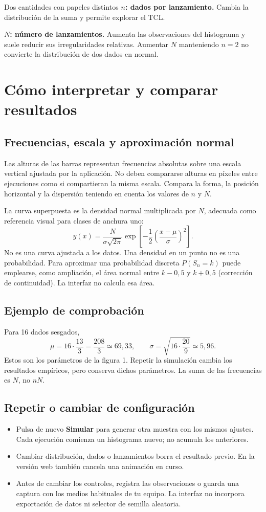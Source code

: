 \documentclass[11pt,a4paper]{article}
\begin{document}
\begin{nota}{Dos cantidades con papeles distintos}
\textbf{$n$: dados por lanzamiento.} Cambia la distribución de la suma y permite explorar el TCL.

\textbf{$N$: número de lanzamientos.} Aumenta las observaciones del histograma y suele reducir sus irregularidades relativas. Aumentar $N$ manteniendo $n=2$ no convierte la distribución de dos dados en normal.
\end{nota}

\clearpage\section{Cómo interpretar y comparar resultados}
\subsection{Frecuencias, escala y aproximación normal}
Las alturas de las barras representan frecuencias absolutas sobre una escala vertical ajustada por la aplicación. No deben compararse alturas en píxeles entre ejecuciones como si compartieran la misma escala. Compara la forma, la posición horizontal y la dispersión teniendo en cuenta los valores de $n$ y $N$.

La curva superpuesta es la densidad normal multiplicada por $N$, adecuada como referencia visual para clases de anchura uno:
\[
y(x)=\frac{N}{\sigma\sqrt{2\pi}}\exp\!\left[-\frac12\left(\frac{x-\mu}{\sigma}\right)^2\right].
\]
No es una curva ajustada a los datos. Una densidad en un punto no es una probabilidad. Para aproximar una probabilidad discreta $P(S_n=k)$ puede emplearse, como ampliación, el área normal entre $k-0{,}5$ y $k+0{,}5$ (corrección de continuidad). La interfaz no calcula esa área.

\subsection{Ejemplo de comprobación}
Para 16 dados sesgados,
\[
\mu=16\cdot\frac{13}{3}=\frac{208}{3}\simeq69{,}33,
\qquad \sigma=\sqrt{16\cdot\frac{20}{9}}\simeq5{,}96.
\]
Estos son los parámetros de la figura 1. Repetir la simulación cambia los resultados empíricos, pero conserva dichos parámetros. La suma de las frecuencias es $N$, no $nN$.

\subsection{Repetir o cambiar de configuración}
\begin{itemize}
\item Pulsa de nuevo \textbf{Simular} para generar otra muestra con los mismos ajustes. Cada ejecución comienza un histograma nuevo; no acumula los anteriores.
\item Cambiar distribución, dados o lanzamientos borra el resultado previo. En la versión web también cancela una animación en curso.
\item Antes de cambiar los controles, registra las observaciones o guarda una captura con los medios habituales de tu equipo. La interfaz no incorpora exportación de datos ni selector de semilla aleatoria.
\end{itemize}
\end{document}
